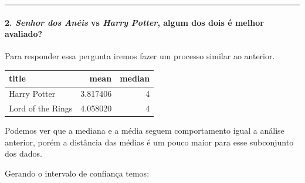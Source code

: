 \documentclass[]{article}
\newenvironment{Shaded}{\begin{snugshade}}{\end{snugshade}}
\newcommand{\DataTypeTok}[1]{\textcolor[rgb]{0.13,0.29,0.53}{#1}}
\newcommand{\KeywordTok}[1]{\textcolor[rgb]{0.13,0.29,0.53}{\textbf{#1}}}
\newcommand{\NormalTok}[1]{#1}
\newcommand{\OperatorTok}[1]{\textcolor[rgb]{0.81,0.36,0.00}{\textbf{#1}}}
\newcommand{\StringTok}[1]{\textcolor[rgb]{0.31,0.60,0.02}{#1}}
\let\oldparagraph\paragraph
\renewcommand{\paragraph}[1]{\oldparagraph{#1}\mbox{}}
\begin{document}
\begin{center}\rule{0.5\linewidth}{\linethickness}\end{center}

\hypertarget{senhor-dos-anuxe9is-vs-harry-potter-algum-dos-dois-uxe9-melhor-avaliado}{%
\paragraph{\texorpdfstring{2. \textbf{\emph{Senhor dos Anéis} vs
\emph{Harry Potter}, algum dos dois é melhor
avaliado?}}{2. Senhor dos Anéis vs Harry Potter, algum dos dois é melhor avaliado?}}\label{senhor-dos-anuxe9is-vs-harry-potter-algum-dos-dois-uxe9-melhor-avaliado}}

Para responder essa pergunta iremos fazer um processo similar ao
anterior.

\begin{Shaded}
\end{Shaded}

\begin{longtable}[]{@{}lrr@{}}
\toprule
title & mean & median\tabularnewline
\midrule
\endhead
Harry Potter & 3.817406 & 4\tabularnewline
Lord of the Rings & 4.058020 & 4\tabularnewline
\bottomrule
\end{longtable}

Podemos ver que a mediana e a média seguem comportamento igual a análise
anterior, porém a distância das médias é um pouco maior para esse
subconjunto dos dados.

Gerando o intervalo de confiança temos:
\end{document}

